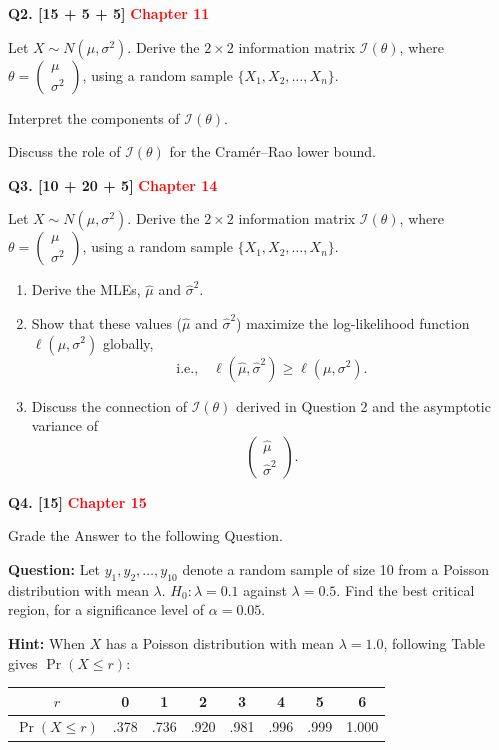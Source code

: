 \documentclass[11pt]{article}
\begin{document}
\bigskip

\textbf{Q2. [15 + 5 + 5]} \textbf{\textcolor{red}{Chapter 11}}

Let $X\sim N(\mu,\sigma^2)$. Derive the $2\times2$ information matrix $\mathcal I(\theta)$, where $\theta=\begin{pmatrix}\mu\\\sigma^2\end{pmatrix}$, using a random sample $\{X_1,X_2,\ldots,X_n\}$.

Interpret the components of $\mathcal I(\theta)$.

Discuss the role of $\mathcal I(\theta)$ for the Cram\'er--Rao lower bound.

\bigskip

\textbf{Q3. [10 + 20 + 5]} \textbf{\textcolor{red}{Chapter 14}}

Let $X\sim N(\mu,\sigma^2)$. Derive the $2\times2$ information matrix $\mathcal I(\theta)$, where $\theta=\begin{pmatrix}\mu\\\sigma^2\end{pmatrix}$, using a random sample $\{X_1,X_2,\ldots,X_n\}$.

\begin{enumerate}
\item[(a)] Derive the MLEs, $\hat\mu$ and $\hat\sigma^2$.
\item[(b)] Show that these values ($\hat\mu$ and $\hat\sigma^2$) maximize the log-likelihood function $\ell(\mu,\sigma^2)$ globally,
\[
\text{i.e.,}\quad\ell(\hat\mu,\hat\sigma^2)\geq\ell(\mu,\sigma^2).
\]
\item[(c)] Discuss the connection of $\mathcal I(\theta)$ derived in Question 2 and the asymptotic variance of
\[
\begin{pmatrix}\hat\mu\\\hat\sigma^2\end{pmatrix}.
\]
\end{enumerate}

\bigskip

\textbf{Q4. [15]}  \textbf{\textcolor{red}{Chapter 15}}

Grade the Answer to the following Question.

\textbf{Question:} Let $y_1,y_2,\ldots,y_{10}$ denote a random sample of size 10 from a Poisson distribution with mean $\lambda$. $H_0:\lambda=0.1$ against $\lambda=0.5$. Find the best critical region, for a significance level of $\alpha=0.05$.

\textbf{Hint:} When $X$ has a Poisson distribution with mean $\lambda=1.0$, following Table gives $\Pr(X\leq r)$:
\begin{center}
\begin{tabular}{c|ccccccc}
$r$ & 0 & 1 & 2 & 3 & 4 & 5 & 6 \\ \hline
$\Pr(X\leq r)$ & .378 & .736 & .920 & .981 & .996 & .999 & 1.000
\end{tabular}
\end{center}
\end{document}
